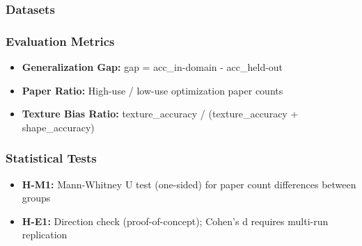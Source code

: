 
\subsubsection{Datasets}

\begin{table}[htbp]
\centering
{}
\end{table}

\subsubsection{Evaluation Metrics}

\begin{itemize}
\item \textbf{Generalization Gap:} gap = acc\_in-domain - acc\_held-out
\item \textbf{Paper Ratio:} High-use / low-use optimization paper counts
\item \textbf{Texture Bias Ratio:} texture\_accuracy / (texture\_accuracy + shape\_accuracy)
\end{itemize}

\subsubsection{Statistical Tests}

\begin{itemize}
\item \textbf{H-M1:} Mann-Whitney U test (one-sided) for paper count differences between groups
\item \textbf{H-E1:} Direction check (proof-of-concept); Cohen's d requires multi-run replication
\end{itemize}

